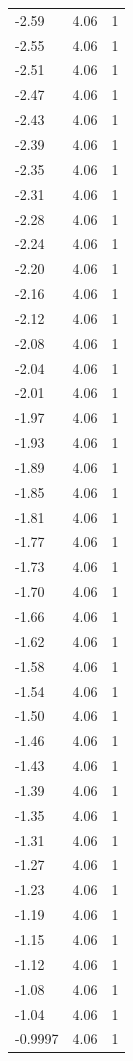 \begin{longtable}{lrr}
  -2.59 & 4.06 & 1 \\
  -2.55 & 4.06 & 1 \\
  -2.51 & 4.06 & 1 \\
  -2.47 & 4.06 & 1 \\
  -2.43 & 4.06 & 1 \\
  -2.39 & 4.06 & 1 \\
  -2.35 & 4.06 & 1 \\
  -2.31 & 4.06 & 1 \\
  -2.28 & 4.06 & 1 \\
  -2.24 & 4.06 & 1 \\
  -2.20 & 4.06 & 1 \\
  -2.16 & 4.06 & 1 \\
  -2.12 & 4.06 & 1 \\
  -2.08 & 4.06 & 1 \\
  -2.04 & 4.06 & 1 \\
  -2.01 & 4.06 & 1 \\
  -1.97 & 4.06 & 1 \\
  -1.93 & 4.06 & 1 \\
  -1.89 & 4.06 & 1 \\
  -1.85 & 4.06 & 1 \\
  -1.81 & 4.06 & 1 \\
  -1.77 & 4.06 & 1 \\
  -1.73 & 4.06 & 1 \\
  -1.70 & 4.06 & 1 \\
  -1.66 & 4.06 & 1 \\
  -1.62 & 4.06 & 1 \\
  -1.58 & 4.06 & 1 \\
  -1.54 & 4.06 & 1 \\
  -1.50 & 4.06 & 1 \\
  -1.46 & 4.06 & 1 \\
  -1.43 & 4.06 & 1 \\
  -1.39 & 4.06 & 1 \\
  -1.35 & 4.06 & 1 \\
  -1.31 & 4.06 & 1 \\
  -1.27 & 4.06 & 1 \\
  -1.23 & 4.06 & 1 \\
  -1.19 & 4.06 & 1 \\
  -1.15 & 4.06 & 1 \\
  -1.12 & 4.06 & 1 \\
  -1.08 & 4.06 & 1 \\
  -1.04 & 4.06 & 1 \\
  -0.9997 & 4.06 & 1 \\

\end{longtable}
